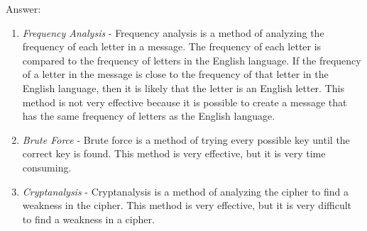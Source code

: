 \documentclass[11pt]{article}
\begin{document}
\begin{enumerate}
	      Answer:
	      \begin{enumerate}
		      \item \textit{Frequency Analysis} - Frequency analysis is a method of analyzing the frequency of each letter in a message. The frequency of each letter is compared to the frequency of letters in the English language. If the frequency of a letter in the message is close to the frequency of that letter in the English language, then it is likely that the letter is an English letter. This method is not very effective because it is possible to create a message that has the same frequency of letters as the English language.
		      \item \textit{Brute Force} - Brute force is a method of trying every possible key until the correct key is found. This method is very effective, but it is very time consuming.
		      \item \textit{Cryptanalysis} - Cryptanalysis is a method of analyzing the cipher to find a weakness in the cipher. This method is very effective, but it is very difficult to find a weakness in a cipher.

	      \end{enumerate}
\end{enumerate}
\end{document}
